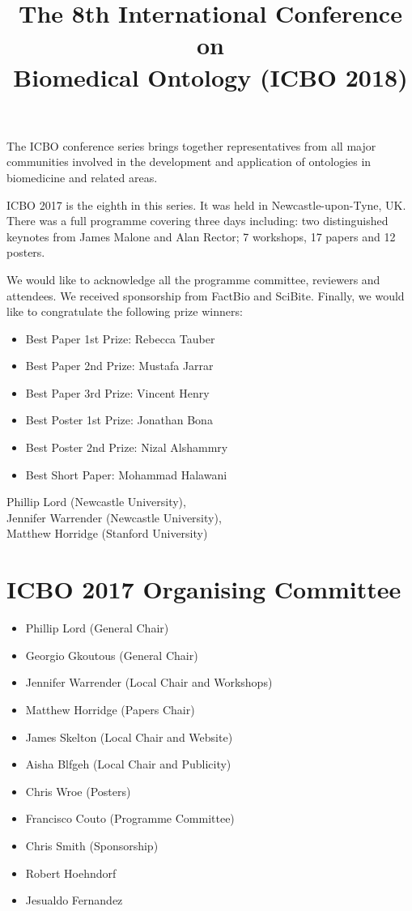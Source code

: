 \documentclass{article}
\title{The 8th International Conference on\\Biomedical Ontology (ICBO 2018)}
\date{}
\begin{document}
\parindent0pt
\parskip15pt
\maketitle

The ICBO conference series brings together representatives from all
major communities involved in the development and application of
ontologies in biomedicine and related areas.

ICBO 2017 is the eighth in this series. It was held in
Newcastle-upon-Tyne, UK. There was a full programme covering three
days including: two distinguished keynotes from James Malone and Alan
Rector; 7 workshops, 17 papers and 12 posters.

We would like to acknowledge all the programme committee, reviewers and
attendees. We received sponsorship from FactBio and SciBite. Finally, we would like to congratulate the following prize winners:

\begin{itemize}
\item Best Paper 1st Prize: Rebecca Tauber
\item Best Paper 2nd Prize: Mustafa Jarrar
\item Best Paper 3rd Prize: Vincent Henry
\item Best Poster 1st Prize: Jonathan Bona
\item Best Poster 2nd Prize: Nizal Alshammry
\item Best Short Paper: Mohammad Halawani
\end{itemize}

Phillip Lord (Newcastle University),\\
Jennifer Warrender (Newcastle University),\\
Matthew Horridge (Stanford University)

\section*{ICBO 2017 Organising Committee}

\begin{itemize}
\item Phillip Lord (General Chair)
\item Georgio Gkoutous (General Chair)
\item Jennifer Warrender (Local Chair and Workshops)
\item Matthew Horridge (Papers Chair)
\item James Skelton (Local Chair and Website)
\item Aisha Blfgeh (Local Chair and Publicity)
\item Chris Wroe (Posters)
\item Francisco Couto (Programme Committee)
\item Chris Smith (Sponsorship) 
\item Robert Hoehndorf
\item Jesualdo Fernandez
\end{itemize}
\newpage
\end{document}
